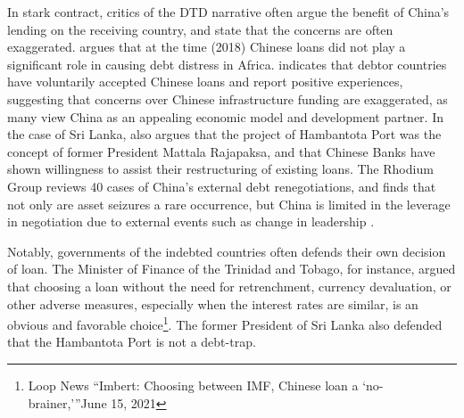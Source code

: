 In stark contract, critics of the DTD narrative often argue the benefit of China's lending on the receiving country, and state that the concerns are often exaggerated.
\citet*{Eom-18} argues that at the time (2018) Chinese loans did not play a significant role in causing debt distress in Africa.
\citet*{Brautigam-meme-2020} indicates that debtor countries have voluntarily accepted Chinese loans and report positive experiences, suggesting that concerns over Chinese infrastructure funding are exaggerated, as many view China as an appealing economic model and development partner.
In the case of Sri Lanka, \citet*{Brautigam-meme-2020} also argues that the project of Hambantota Port was the concept of former President Mattala Rajapaksa, and that Chinese Banks have shown willingness to assist their restructuring of existing loans.
The Rhodium Group reviews 40 cases of China's external debt renegotiations, and finds that not only are asset seizures a rare occurrence, but China is limited in the leverage in negotiation due to external events such as change in leadership \citep*{Rhodium-DTD-19}.

Notably, governments of the indebted countries often defends their own decision of loan. The Minister of Finance of the Trinidad and Tobago, for instance, argued that choosing a loan without the need for retrenchment, currency devaluation, or other adverse measures, especially when the interest rates are similar, is an obvious and favorable choice\footnote{Loop News ``Imbert: Choosing between IMF, Chinese loan a `no-brainer,'''June 15, 2021}. The former President of Sri Lanka also defended that the Hambantota Port is not a debt-trap.

